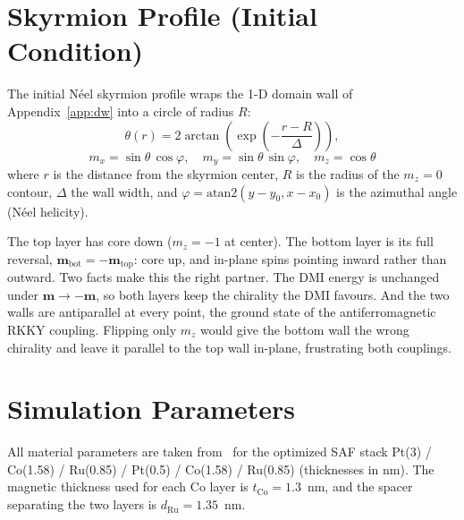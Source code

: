 \documentclass[11pt,a4paper]{article}
\newcommand{\mb}[1]{\mathbf{#1}}
\newcommand{\tCo}{t_{\text{Co}}}
\begin{document}
\section{Skyrmion Profile (Initial Condition)}

The initial N\'{e}el skyrmion profile wraps the 1-D domain wall of
Appendix~\ref{app:dw} into a circle of radius $R$:
%
\begin{equation}
\theta(r) = 2\arctan\!\left(
    \exp\!\left(-\frac{r - R}{\Delta}\right)\right),
\end{equation}
%
\begin{equation}
m_x = \sin\theta \, \cos\varphi, \quad
m_y = \sin\theta \, \sin\varphi, \quad
m_z = \cos\theta
\end{equation}
%
where $r$ is the distance from the skyrmion center, $R$ is the
radius of the $m_z = 0$ contour, $\Delta$ the wall width, and
$\varphi = \text{atan2}(y - y_0, x - x_0)$ is the azimuthal angle
(N\'{e}el helicity).

The top layer has core down ($m_z = -1$ at center).  The bottom
layer is its full reversal, $\mb{m}_{\text{bot}} = -\mb{m}_{\text{top}}$:
core up, and in-plane spins pointing inward rather than outward.
Two facts make this the right partner.  The DMI energy is unchanged
under $\mb{m} \to -\mb{m}$, so both layers keep the chirality the
DMI favours.  And the two walls are antiparallel at every point, the
ground state of the antiferromagnetic RKKY coupling.  Flipping only
$m_z$ would give the bottom wall the wrong chirality and leave it
parallel to the top wall in-plane, frustrating both couplings.

\section{Simulation Parameters}

All material parameters are taken from~\cite{pham2024} for the
optimized SAF stack
Pt(3) / Co(1.58) / Ru(0.85) / Pt(0.5) / Co(1.58) / Ru(0.85)
(thicknesses in nm).  The magnetic thickness used for each Co layer
is $\tCo = 1.3$~nm, and the spacer separating the two layers is
$d_{\text{Ru}} = 1.35$~nm.
\end{document}
